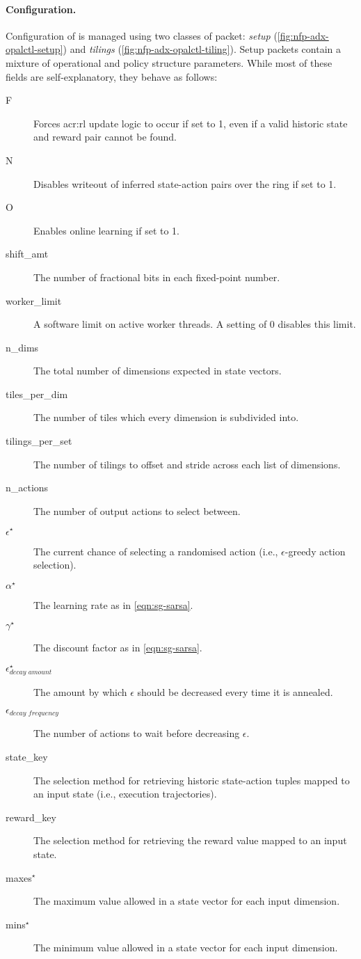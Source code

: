 \paragraph{Configuration.}
Configuration of \approachshort{} is managed using two classes of packet: \emph{setup} (\cref{fig:nfp-adx-opalctl-setup}) and \emph{tilings} (\cref{fig:nfp-adx-opalctl-tiling}).
Setup packets contain a mixture of operational and policy structure parameters.
While most of these fields are self-explanatory, they behave as follows:
\begin{description}
	\item[F] Forces \gls{acr:rl} update logic to occur if set to 1, even if a valid historic state and reward pair cannot be found.
	\item[N] Disables writeout of inferred state-action pairs over the \outring{} ring if set to 1.
	\item[O] Enables online learning if set to 1.
	\item[shift\_amt] The number of fractional bits in each fixed-point number.
	\item[worker\_limit] A software limit on active worker threads. A setting of 0 disables this limit.
	\item[n\_dims] The total number of dimensions expected in state vectors.
	\item[tiles\_per\_dim] The number of tiles which every dimension is subdivided into.
	\item[tilings\_per\_set] The number of tilings to offset and stride across each list of dimensions.
	\item[n\_actions] The number of output actions to select between.
	\item[$\epsilon^\star$] The current chance of selecting a randomised action (i.e., $\epsilon$-greedy action selection).
	\item[$\alpha^\star$] The learning rate as in \cref{eqn:sg-sarsa}.
	\item[$\gamma^\star$] The discount factor as in \cref{eqn:sg-sarsa}.
	\item[$\epsilon_\textit{decay amount}^\star$] The amount by which $\epsilon$ should be decreased every time it is annealed.
	\item[$\epsilon_\textit{decay frequency}$] The number of actions to wait before decreasing $\epsilon$.
	\item[state\_key] The selection method for retrieving historic state-action tuples mapped to an input state (i.e., execution trajectories).
	\item[reward\_key] The selection method for retrieving the reward value mapped to an input state.
	\item[maxes$^\star$] The maximum value allowed in a state vector for each input dimension.
	\item[mins$^\star$] The minimum value allowed in a state vector for each input dimension.
\end{description}
